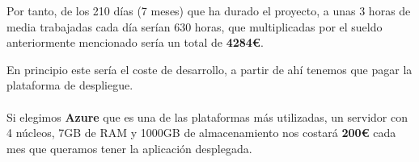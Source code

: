 Por tanto, de los 210 días (7 meses) que ha durado el proyecto, a unas 3 horas de media trabajadas cada día serían 630 horas, que multiplicadas por el sueldo anteriormente mencionado sería un total de \textbf{4284\euro}.

En principio este sería el coste de desarrollo, a partir de ahí tenemos que pagar la plataforma de despliegue.\\ \\
Si elegimos \textbf{Azure} \cite{azure} que es una de las plataformas más utilizadas, un servidor con 4 núcleos, 7GB de RAM y 1000GB de almacenamiento nos costará \textbf{200\euro} cada mes que queramos tener la aplicación desplegada.\\
